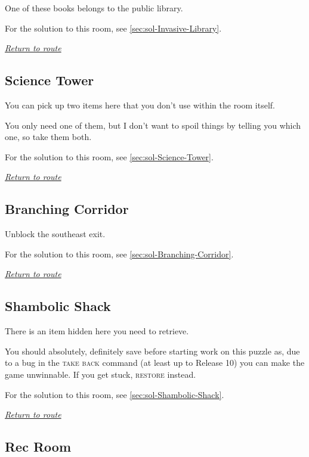 \documentclass[a5paper]{extarticle}
\begin{document}
One of these books belongs to the public library.

For the solution to this room, see \cref{sec:sol-Invasive-Library}.

\hyperref[sec:route-10]{\emph{Return to route}}

\newpage
\subsection{Science Tower}\label{sec:req-Science-Tower}

You can pick up two items here that you don't use within the room itself.

You only need one of them,
but I don't want to spoil things by telling you which one, so take them both.

For the solution to this room, see \cref{sec:sol-Science-Tower}.

\hyperref[sec:route-10]{\emph{Return to route}}

\newpage
\subsection{Branching Corridor}\label{sec:req-Branching-Corridor}

Unblock the southeast exit.

For the solution to this room, see \cref{sec:sol-Branching-Corridor}.

\hyperref[sec:route-10]{\emph{Return to route}}

\newpage
\subsection{Shambolic Shack}\label{sec:req-Shambolic-Shack}

There is an item hidden here you need to retrieve.

You should absolutely, definitely save before starting work on this puzzle as,
due to a bug in the \textsc{take back} command (at least up to Release 10)
you can make the game unwinnable. If you get stuck, \textsc{restore} instead.

For the solution to this room, see \cref{sec:sol-Shambolic-Shack}.

\hyperref[sec:route-11]{\emph{Return to route}}

\newpage
\subsection{Rec Room}\label{sec:req-Rec-Room}
\end{document}
